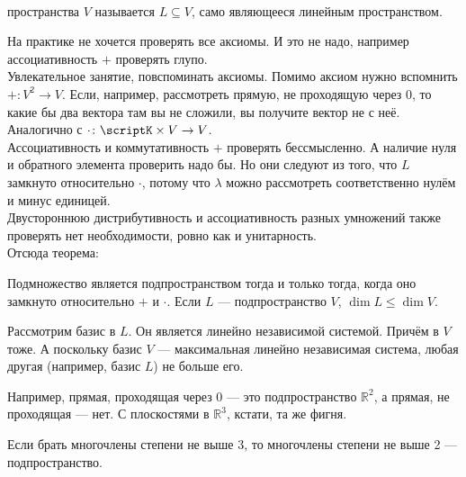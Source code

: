 \documentclass{article}
\begin{document}
    \paragraph{}
    \begin{itemize}
        \dfn {} пространства $V$ называется $L\subseteq V$, само являющееся линейным пространством.
        \begin{Comment}
            На практике не хочется проверять все аксиомы. И это не надо, например ассоциативность $+$ проверять глупо.\\
            Увлекательное занятие, повспоминать аксиомы. Помимо аксиом нужно вспомнить $+\colon V^2\to V$. Если, например, рассмотреть прямую, не проходящую через 0, то какие бы два вектора там вы не сложили, вы получите вектор не с неё. Аналогично с $\cdot\colon\scriptK\times V\to V$.\\
            Ассоциативность и коммутативность $+$ проверять бессмысленно. А наличие нуля и обратного элемента проверить надо бы. Но они следуют из того, что $L$ замкнуто  относительно $\cdot$, потому что $\lambda$ можно рассмотреть соответственно нулём и минус единицей.\\
            Двустороннюю дистрибутивность и ассоциативность разных умножений также проверять нет необходимости, ровно как и унитарность.\\
            Отсюда теорема:
        \end{Comment}
        \thm Подмножество является подпространством тогда и только тогда, когда оно замкнуто относительно $+$ и $\cdot$.
        \thm Если $L$ --- подпространство $V$, $\dim L\leqslant\dim V$.
        \begin{Proof}
            Рассмотрим базис в $L$. Он является линейно независимой системой. Причём в $V$ тоже. А поскольку базис $V$ --- максимальная линейно независимая система, любая другая (например, базис $L$) не больше его.
        \end{Proof}
        \begin{Example}
            Например, прямая, проходящая через 0 --- это подпространство $\mathbb R^2$, а прямая, не проходящая --- нет. С плоскостями в $\mathbb R^3$, кстати, та же фигня.
        \end{Example}
        \begin{Example}
            Если брать многочлены степени не выше 3, то многочлены степени не выше 2 --- подпространство.

\end{Example}
\end{itemize}
\end{document}
